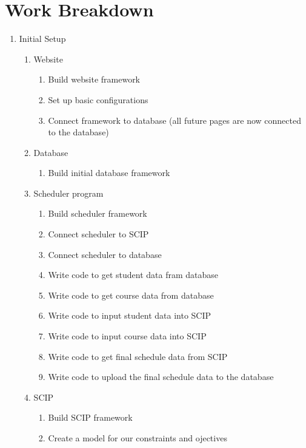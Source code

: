 \documentclass[11pt]{article}
\begin{document}
\section{Work Breakdown} %

\begin{enumerate}
\item Initial Setup
\begin{enumerate}
\item Website
\begin{enumerate}
\item Build website framework
\item Set up basic configurations
\item Connect framework to database (all future pages are now connected to the database)
\end{enumerate}
\item Database
\begin{enumerate}
\item Build initial database framework
\end{enumerate}
\item Scheduler program
\begin{enumerate}
\item Build scheduler framework
\item Connect scheduler to SCIP
\item Connect scheduler to database
\item Write code to get student data fram database
\item Write code to get course data from database
\item Write code to input student data into SCIP
\item Write code to input course data into SCIP
\item Write code to get final schedule data from SCIP
\item Write code to upload the final schedule data to the database
\end{enumerate}
\item SCIP
\begin{enumerate}
\item Build SCIP framework
\item Create a model for our constraints and ojectives
\end{enumerate}
\end{enumerate}


\end{enumerate}
\end{document}
